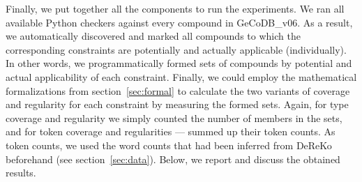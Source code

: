 \documentclass[10pt, a4paper]{article}
\begin{document}










Finally, we put together all the components to run the experiments. We ran all available Python checkers against every compound in GeCoDB\_v06. As a result, we automatically discovered and marked all compounds to which the corresponding constraints are potentially and actually applicable (individually). In other words, we programmatically formed sets of compounds by potential and actual applicability of each constraint. Finally, we could employ the mathematical formalizations from section~\ref{sec:formal} to calculate the two variants of coverage and regularity for each constraint by measuring the formed sets. Again, for type coverage and regularity we simply counted the number of members in the sets, and for token coverage and regularities --- summed up their token counts. As token counts, we used the word counts that had been inferred from DeReKo beforehand (see section~\ref{sec:data}). Below, we report and discuss the obtained results.
\end{document}
